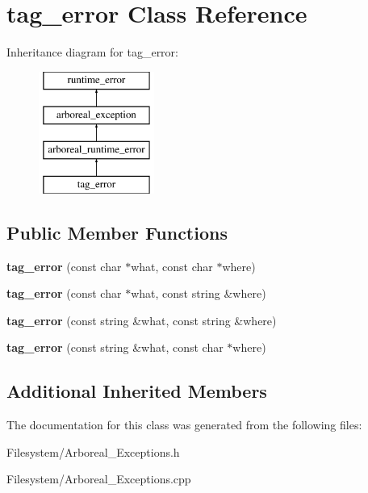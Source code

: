 \hypertarget{classtag__error}{}\section{tag\+\_\+error Class Reference}
\label{classtag__error}
Inheritance diagram for tag\+\_\+error\+:\begin{figure}[H]
\begin{center}
\leavevmode
\includegraphics[height=4.000000cm]{classtag__error}
\end{center}
\end{figure}
\subsection*{Public Member Functions}
\begin{DoxyCompactItemize}
\item 
\mbox{\label{classtag__error_a4b5b0b99428cd336f5055ebffe948264}} 
{\bfseries tag\+\_\+error} (const char $\ast$what, const char $\ast$where)
\item 
\mbox{\label{classtag__error_ae7555051a3448b2e7adb1579985f820b}} 
{\bfseries tag\+\_\+error} (const char $\ast$what, const string \&where)
\item 
\mbox{\label{classtag__error_a145a30992b2b0bb2f675bea4a0a6b9b9}} 
{\bfseries tag\+\_\+error} (const string \&what, const string \&where)
\item 
\mbox{\label{classtag__error_a9514ff946e2998b5914dd38c27b1aef5}} 
{\bfseries tag\+\_\+error} (const string \&what, const char $\ast$where)
\end{DoxyCompactItemize}
\subsection*{Additional Inherited Members}


The documentation for this class was generated from the following files\+:\begin{DoxyCompactItemize}
\item 
Filesystem/Arboreal\+\_\+\+Exceptions.\+h\item 
Filesystem/Arboreal\+\_\+\+Exceptions.\+cpp\end{DoxyCompactItemize}
